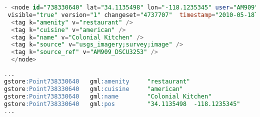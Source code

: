 

\lstset{showstringspaces=false} 

\begin{lstlisting}[caption={An XML data excerpt from the OpenStreetMap project.},
                  language=SQL,
                  label={list2},
				  frame=single]
- <node id="738330640" lat="34.1135498" lon="-118.1235345" user="AM909" uid="82317"
 visible="true" version="1" changeset="4737707"  timestamp="2010-05-18T11:26:40Z">
  <tag k="amenity" v="restaurant" />
  <tag k="cuisine" v="american" />
  <tag k="name" v="Colonial Kitchen" />
  <tag k="source" v="usgs_imagery;survey;image" />
  <tag k="source_ref" v="AM909_DSCU3253" />
  </node>
\end{lstlisting}


\lstset{showstringspaces=false} 

\begin{lstlisting}[caption={The RDF representation of the restaurant described in Listing~\ref{list2}.},
                  language=SQL,
                   label={list3},
                   frame=single]
...
gstore:Point738330640   gml:amenity     "restaurant"
gstore:Point738330640   gml:cuisine     "american"
gstore:Point738330640   gml:name        "Colonial Kitchen"
gstore:Point738330640   gml:pos         "34.1135498  -118.1235345"
...
\end{lstlisting}


